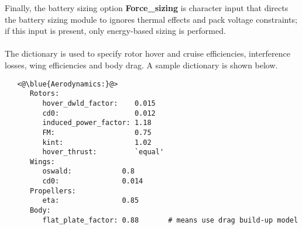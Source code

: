 Finally, the battery sizing option \textbf{Force\_sizing} is character input that directs the battery sizing module to ignores thermal effects and pack voltage constraints; if this input is present, only energy-based sizing is performed.

\paragraph{}
The  dictionary is used to specify rotor hover and cruise efficiencies, interference losses, wing efficiencies and body drag. A sample dictionary is shown below.


\begin{lstlisting}
   <@\blue{Aerodynamics:}@>
      Rotors:
         hover_dwld_factor:    0.015
         cd0:                  0.012
         induced_power_factor: 1.18
         FM:                   0.75
         kint:                 1.02
         hover_thrust:         `equal'
      Wings:
         oswald:            0.8
         cd0:               0.014
      Propellers:
         eta:               0.85
      Body:
         flat_plate_factor: 0.88       # means use drag build-up model
\end{lstlisting}

